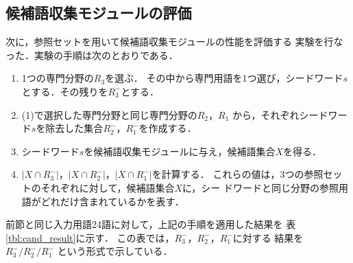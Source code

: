 \subsection{候補語収集モジュールの評価}\label{sec:ex_cand}

次に，参照セットを用いて候補語収集モジュールの性能を評価する
実験を行なった．実験の手順は次のとおりである．
\begin{enumerate}
\item 
1つの専門分野の$R_3$を選ぶ．
その中から専門用語を1つ選び，シードワード$s$とする．その残りを$R_3^{-}$とする．
\item
(1)で選択した専門分野と同じ専門分野の$R_2$，$R_1$
から，それぞれシードワード$s$を除去した集合$R_2^{-}$，$R_1^{-}$を作成する．
\item
シードワード$s$を候補語収集モジュールに与え，候補語集合$X$を得る．
\item 
$|X \cap R_3^{-}|$，$|X \cap R_2^{-}|$，$|X \cap R_1^{-}|$を計算する．
これらの値は，3つの参照セットのそれぞれに対して，候補語集合$X$に，シー
ドワードと同じ分野の参照用語がどれだけ含まれているかを表す．

\end{enumerate}

前節と同じ入力用語24語に対して，上記の手順を適用した結果を
\mbox{表\ref{tbl:cand_result}}に示す．
この表では，$R_3^{-}$，$R_2^{-}$，$R_1^{-}$に対する
結果を $R_3^{-}/R_2^{-}/R_1^{-}$ という形式で示している．


